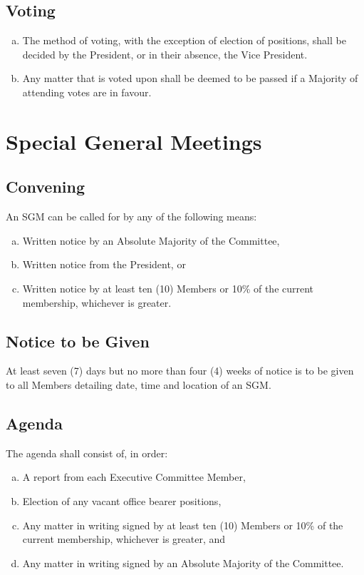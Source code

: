 \documentclass[a4paper,12pt]{article}
\begin{document}
\subsection{Voting}

\begin{enumerate}[a)]
	\item The method of voting, with the exception of election of positions, shall be decided by the President, or in their absence, the Vice President.
	\item Any matter that is voted upon shall be deemed to be passed if a Majority of attending votes are in favour.
\end{enumerate}

\section{Special General Meetings}

\subsection{Convening}

An SGM can be called for by any of the following means:

\begin{enumerate}[a)]
	\item Written notice by an Absolute Majority of the Committee,
	\item Written notice from the President, or
	\item Written notice by at least ten (10) Members or 10\% of the current membership, whichever is greater.
\end{enumerate}

\subsection{Notice to be Given}

At least seven (7) days but no more than four (4) weeks of notice is to be given to all Members detailing date, time and location of an SGM.

\subsection{Agenda}

The agenda shall consist of, in order:

\begin{enumerate}[a)]
	\item A report from each Executive Committee Member,
	\item Election of any vacant office bearer positions,
	\item Any matter in writing signed by at least ten (10) Members or 10\% of the current membership, whichever is greater, and
	\item Any matter in writing signed by an Absolute Majority of the Committee.
\end{enumerate}
\end{document}
